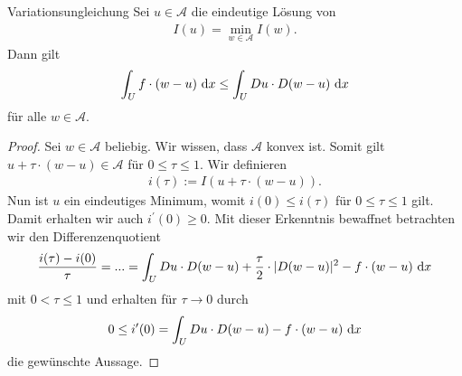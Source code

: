 \begin{genericthm}{Variationsungleichung}\label{skript:2.2}
Sei $u \in \mathcal{A}$ die eindeutige Lösung von
\begin{align*}
I(u) = \min \limits_{w \in \mathcal{A}} I(w).
\end{align*}
Dann gilt
\begin{equation}\label{equ:2.3}
\int_U f \cdot (w - u) \ \text{\rmfamily d} x 
\leq 
\int_U Du \cdot D(w- u) \ \text{\rmfamily d} x
\end{equation}
für alle $w \in \mathcal{A}$.
\end{genericthm}

\begin{proof}
Sei $w \in \mathcal{A}$ beliebig.
Wir wissen, dass $\mathcal{A}$ konvex ist.
Somit gilt $  u + \tau \cdot (w - u) \in \mathcal{A}$ für $0 \leq \tau \leq 1$.
Wir definieren
\begin{align*}
i(\tau) := I (u + \tau \cdot (w - u) ).
\end{align*}
Nun ist $u$ ein eindeutiges Minimum, womit  $i(0) \leq i ( \tau ) $ für $0 \leq \tau \leq 1 $ gilt.
Damit erhalten wir auch $i^\prime(0) \geq 0$.
Mit dieser Erkenntnis bewaffnet betrachten wir den Differenzenquotient
\begin{align*}
\frac{i(\tau) - i(0)}{\tau}
= ...
= \int_U Du \cdot D(w-u) + \frac{\tau}{2} \cdot | D(w-u)|^2 - f \cdot (w- u) \ \text{\rmfamily d} x
\end{align*}
mit $0 < \tau \leq 1$ und erhalten für $\tau \rightarrow 0 $  durch
\begin{align*}
0  \leq i^\prime(0) = \int_U Du \cdot D(w-u) - f\cdot (w- u) \ \text{\rmfamily d} x
\end{align*}
die gewünschte Aussage.
\end{proof}

